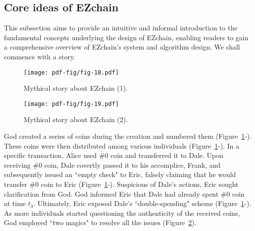 \documentclass[conference]{IEEEtran}
\begin{document}
\subsection{Core ideas of EZchain}
\label{subsec:Core ideas of EZchain}

This subsection aims to provide an intuitive and informal introduction to the fundamental concepts underlying the design of EZchain, enabling readers to gain a comprehensive overview of EZchain's system and algorithm design. We shall commence with a story. 

\begin{figure}[htp!]
    \centering
    \texttt{[image: pdf-fig/fig-18.pdf]}
    \caption{Mythical story about EZchain (1).}
    \label{fig: mythical story of EZchain 1}
\end{figure}

\begin{figure}[htp!]
    \centering
    \texttt{[image: pdf-fig/fig-19.pdf]}
    \caption{Mythical story about EZchain (2).}
    \label{fig: mythical story of EZchain 2}
\end{figure}

God created a series of coins during the creation and numbered them (Figure~\ref{fig: mythical story of EZchain 1}-). These coins were then distributed among various individuals (Figure~\ref{fig: mythical story of EZchain 1}-). In a specific transaction, Alice used $\# 0$ coin and transferred it to Dale. Upon receiving $\# 0$ coin, Dale covertly passed it to his accomplice, Frank, and subsequently issued an ``empty check" to Eric, falsely claiming that he would transfer $\# 0$ coin to Eric (Figure~\ref{fig: mythical story of EZchain 1}-). Suspicious of Dale's actions, Eric sought clarification from God. God informed Eric that Dale had already spent $\# 0$ coin at time $t_3$. Ultimately, Eric exposed Dale's ``double-spending" scheme (Figure~\ref{fig: mythical story of EZchain 1}-). As more individuals started questioning the authenticity of the received coins, God employed ``two magics" to resolve all the issues (Figure~\ref{fig: mythical story of EZchain 2}).
\end{document}
